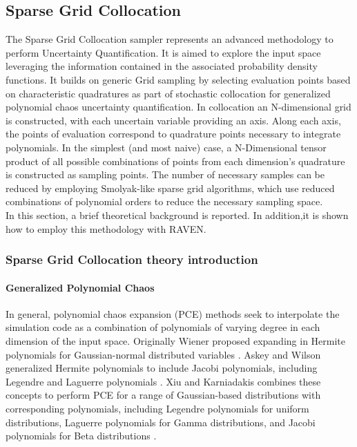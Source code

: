 
\subsection{Sparse Grid Collocation}
\label{sub:Stratified}
The Sparse Grid Collocation sampler represents an advanced methodology to perform Uncertainty Quantification. It is aimed
to explore the input space leveraging the information contained in the associated probability density functions. It builds on generic Grid sampling by selecting evaluation points based on characteristic quadratures as part of stochastic collocation for generalized polynomial chaos uncertainty quantification. In collocation an N-dimensional grid is constructed, with each uncertain variable providing an axis. Along each axis, the points of evaluation correspond to quadrature points necessary to integrate polynomials. In the simplest (and most naive) case, a N-Dimensional tensor product of all possible combinations of points from each dimension’s quadrature is constructed as sampling points. The number of necessary samples can be reduced by employing Smolyak-like sparse grid algorithms, which use reduced combinations of polynomial orders to reduce the necessary sampling space.
\\In this section, a brief theoretical 
background is reported. In addition,it is shown how to employ this methodology with RAVEN.
\subsubsection{Sparse Grid Collocation theory introduction}
\label{subsub:SGctheory}
\paragraph{Generalized Polynomial Chaos}
In general, polynomial chaos expansion (PCE) methods seek to interpolate the simulation code as a combination of
polynomials of varying degree in each dimension of the input space.  Originally Wiener
proposed expanding in Hermite polynomials for Gaussian-normal distributed variables \cite{wiener}.  Askey and
Wilson generalized Hermite polynomials to include Jacobi polynomials, including Legendre and Laguerre
polynomials \cite{Wiener-Askey}.  Xiu and Karniadakis combines these concepts to perform PCE for a range of Gaussian-based
distributions with corresponding polynomials,
including Legendre polynomials for uniform distributions, Laguerre polynomials for Gamma distributions, and
Jacobi polynomials for Beta distributions \cite{xiu}.

